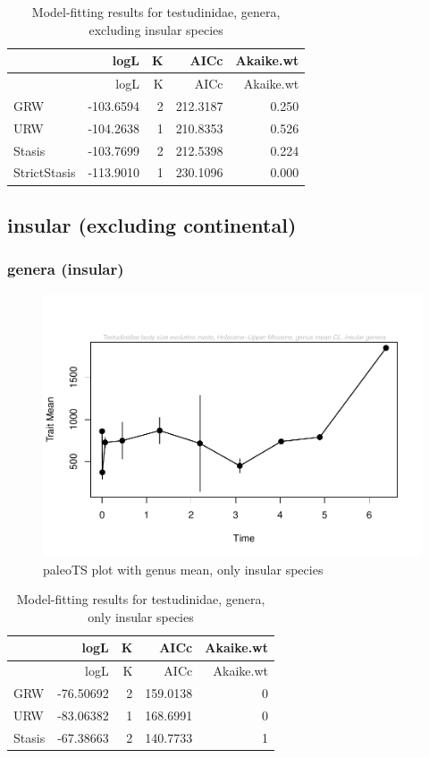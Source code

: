 \documentclass[]{article}
\begin{document}
\begin{longtable}[]{@{}lrrrr@{}}
\caption{Model-fitting results for testudinidae, genera, excluding
insular species}\tabularnewline
\toprule
& logL & K & AICc & Akaike.wt\tabularnewline
\midrule
\endfirsthead
\toprule
& logL & K & AICc & Akaike.wt\tabularnewline
\midrule
\endhead
GRW & -103.6594 & 2 & 212.3187 & 0.250\tabularnewline
URW & -104.2638 & 1 & 210.8353 & 0.526\tabularnewline
Stasis & -103.7699 & 2 & 212.5398 & 0.224\tabularnewline
StrictStasis & -113.9010 & 1 & 230.1096 & 0.000\tabularnewline
\bottomrule
\end{longtable}

\newpage

\subsection{insular (excluding
continental)}\label{insular-excluding-continental}

\subsubsection{genera (insular)}\label{genera-insular}

\begin{figure}[htbp]
\centering
\includegraphics{MA_JJ_files/figure-latex/paleoTS plot with genus mean, excluding continental species-1.pdf}
\caption{paleoTS plot with genus mean, only insular species}
\end{figure}

\begin{longtable}[]{@{}lrrrr@{}}
\caption{Model-fitting results for testudinidae, genera, only insular
species}\tabularnewline
\toprule
& logL & K & AICc & Akaike.wt\tabularnewline
\midrule
\endfirsthead
\toprule
& logL & K & AICc & Akaike.wt\tabularnewline
\midrule
\endhead
GRW & -76.50692 & 2 & 159.0138 & 0\tabularnewline
URW & -83.06382 & 1 & 168.6991 & 0\tabularnewline
Stasis & -67.38663 & 2 & 140.7733 & 1\tabularnewline
\bottomrule
\end{longtable}
\end{document}
